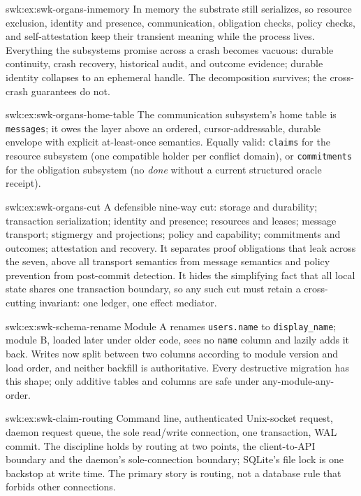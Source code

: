 \begin{pdSolution}{swk:ex:swk-organs-inmemory}
In memory the substrate still serializes, so resource exclusion, identity and presence, communication, obligation checks, policy checks, and self-attestation keep their transient meaning while the process lives. Everything the subsystems promise across a crash becomes vacuous: durable continuity, crash recovery, historical audit, and outcome evidence; durable identity collapses to an ephemeral handle. The decomposition survives; the cross-crash guarantees do not.
\end{pdSolution}
\begin{pdSolution}{swk:ex:swk-organs-home-table}
The communication subsystem's home table is \texttt{messages}; it owes the layer above an ordered, cursor-addressable, durable envelope with explicit at-least-once semantics. Equally valid: \texttt{claims} for the resource subsystem (one compatible holder per conflict domain), or \texttt{commitments} for the obligation subsystem (no \emph{done} without a current structured oracle receipt).
\end{pdSolution}
\begin{pdSolution}{swk:ex:swk-organs-cut}
A defensible nine-way cut: storage and durability; transaction serialization; identity and presence; resources and leases; message transport; stigmergy and projections; policy and capability; commitments and outcomes; attestation and recovery. It separates proof obligations that leak across the seven, above all transport semantics from message semantics and policy prevention from post-commit detection. It hides the simplifying fact that all local state shares one transaction boundary, so any such cut must retain a cross-cutting invariant: one ledger, one effect mediator.
\end{pdSolution}
\begin{pdSolution}{swk:ex:swk-schema-rename}
Module A renames \texttt{users.name} to \texttt{display\_name}; module B, loaded later under older code, sees no \texttt{name} column and lazily adds it back. Writes now split between two columns according to module version and load order, and neither backfill is authoritative. Every destructive migration has this shape; only additive tables and columns are safe under any-module-any-order.
\end{pdSolution}
\begin{pdSolution}{swk:ex:swk-claim-routing}
Command line, authenticated Unix-socket request, daemon request queue, the sole read/write connection, one transaction, WAL commit. The discipline holds by routing at two points, the client-to-API boundary and the daemon's sole-connection boundary; SQLite's file lock is one backstop at write time. The primary story is routing, not a database rule that forbids other connections.
\end{pdSolution}
